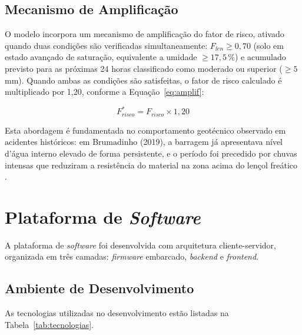 \subsection{Mecanismo de Amplificação}
\label{subsec:amplificacao}

O modelo incorpora um mecanismo de amplificação do fator de risco,
ativado quando duas condições são verificadas simultaneamente:
$F_{len} \geq 0{,}70$ (solo em estado avançado de saturação,
equivalente a umidade $\geq 17{,}5\,\%$) e acumulado previsto para
as próximas 24 horas classificado como moderado ou superior
($\geq 5$\,mm). Quando ambas as condições são satisfeitas, o fator
de risco calculado é multiplicado por 1,20, conforme a
Equação~\ref{eq:amplif}:

\begin{equation}
\label{eq:amplif}
F_{risco}^{*} = F_{risco} \times 1{,}20
\end{equation}

Esta abordagem é fundamentada no comportamento geotécnico observado
em acidentes históricos: em Brumadinho (2019), a barragem já
apresentava nível d'água interno elevado de forma persistente, e o
período foi precedido por chuvas intensas que reduziram a
resistência do material na zona acima do lençol freático
\cite{robertson2019feijaoson2019}.

\section{Plataforma de \textit{Software}}
\label{sec:software}

A plataforma de \textit{software} foi desenvolvida com arquitetura
cliente-servidor, organizada em três camadas: \textit{firmware}
embarcado, \textit{backend} e \textit{frontend}.

\subsection{Ambiente de Desenvolvimento}
\label{subsec:ambiente}

As tecnologias utilizadas no desenvolvimento estão listadas na
Tabela~\ref{tab:tecnologias}.

